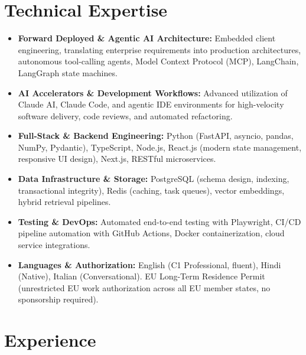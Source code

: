\documentclass[10pt,a4paper]{article}
\begin{document}
\section{Technical Expertise}
\begin{itemize}
  \item \textbf{Forward Deployed \& Agentic AI Architecture:} Embedded client engineering, translating enterprise requirements into production architectures, autonomous tool-calling agents, Model Context Protocol (MCP), LangChain, LangGraph state machines.
  \item \textbf{AI Accelerators \& Development Workflows:} Advanced utilization of Claude AI, Claude Code, and agentic IDE environments for high-velocity software delivery, code reviews, and automated refactoring.
  \item \textbf{Full-Stack \& Backend Engineering:} Python (FastAPI, asyncio, pandas, NumPy, Pydantic), TypeScript, Node.js, React.js (modern state management, responsive UI design), Next.js, RESTful microservices.
  \item \textbf{Data Infrastructure \& Storage:} PostgreSQL (schema design, indexing, transactional integrity), Redis (caching, task queues), vector embeddings, hybrid retrieval pipelines.
  \item \textbf{Testing \& DevOps:} Automated end-to-end testing with Playwright, CI/CD pipeline automation with GitHub Actions, Docker containerization, cloud service integrations.
  \item \textbf{Languages \& Authorization:} English (C1 Professional, fluent), Hindi (Native), Italian (Conversational). EU Long-Term Residence Permit (unrestricted EU work authorization across all EU member states, no sponsorship required).
\end{itemize}

\section{Experience}
\end{document}
